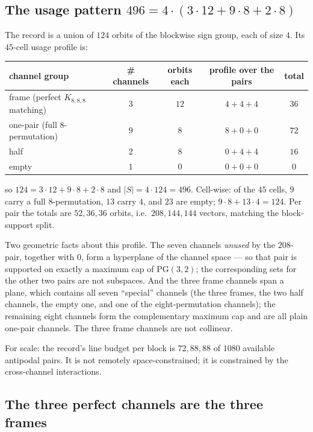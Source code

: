 \documentclass[10pt,a4paper]{article}
\begin{document}
\subsection{The usage pattern $496 = 4\cdot(3\cdot 12 + 9\cdot 8 + 2\cdot 8)$}

The record is a union of $124$ orbits of the blockwise sign group, each of size $4$. Its $45$-cell
usage profile is:

\begin{center}
\small
\begin{tabular}{@{}lcccc@{}}
\toprule
channel group & \# channels & orbits each & profile over the pairs & total \\
\midrule
frame (perfect $K_{8,8,8}$ matching) & $3$ & $12$ & $4+4+4$ & $36$ \\
one-pair (full $8$-permutation) & $9$ & $8$ & $8+0+0$ & $72$ \\
half & $2$ & $8$ & $0+4+4$ & $16$ \\
empty & $1$ & $0$ & $0+0+0$ & $0$ \\
\bottomrule
\end{tabular}
\end{center}
so $124 = 3\cdot 12 + 9 \cdot 8 + 2 \cdot 8$ and $|S| = 4 \cdot 124 = 496$. Cell-wise: of the $45$
cells, $9$ carry a full $8$-permutation, $13$ carry $4$, and $23$ are empty;
$9 \cdot 8 + 13 \cdot 4 = 124$. Per pair the totals are $52, 36, 36$ orbits, i.e.\ $208, 144, 144$
vectors, matching the block-support split.

Two geometric facts about this profile. The seven channels \emph{unused} by the $208$-pair, together
with $0$, form a hyperplane of the channel space --- so that pair is supported on exactly a maximum
cap of $\mathrm{PG}(3,2)$; the corresponding sets for the other two pairs are not subspaces. And the
three frame channels span a plane, which contains all seven ``special'' channels (the three frames,
the two half channels, the empty one, and one of the eight-permutation channels); the remaining
eight channels form the complementary maximum cap and are all plain one-pair channels. The three
frame channels are not collinear.

For scale: the record's line budget per block is $72, 88, 88$ of $1080$ available antipodal pairs.
It is not remotely space-constrained; it is constrained by the cross-channel interactions.

\subsection{The three perfect channels are the three frames}
\end{document}
